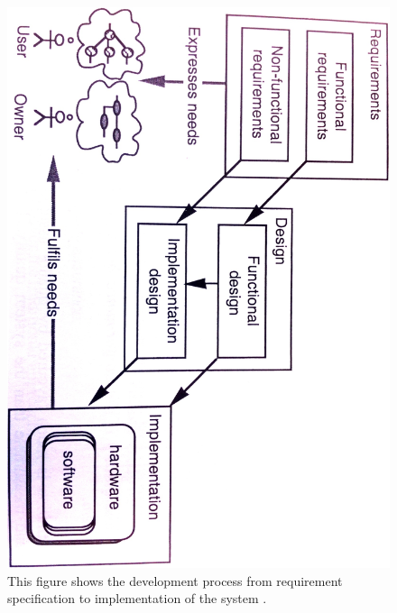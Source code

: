 \begin{figure} [H]
\centering
\includegraphics[scale=0.1]{requirements.jpg}
\caption[Main descriptions of system design]{This figure shows the development process from requirement specification to implementation of the system \cite{systemutviklingDel1}.}
\label{fig:requirements}
\end{figure} 

